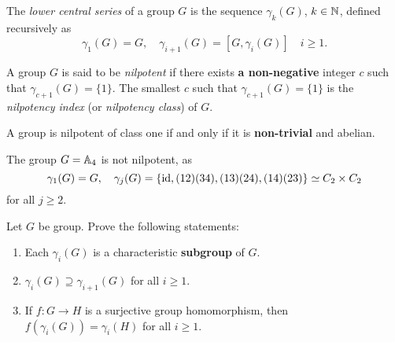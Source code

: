 The {\em lower central series} of a group $G$ is 
the sequence $\gamma_k(G)$, $k\in\mathbb{N}$, 
defined recursively as 
\[
		\gamma_1(G)=G,\quad
		\gamma_{i+1}(G)=[G,\gamma_i(G)]\quad i\geq 1.
\]

A group $G$ is said to be {\em nilpotent} if there exists {\bf a non-negative} integer $c$ such that 
$\gamma_{c+1}(G)=\{1\}$. The smallest $c$ such that $\gamma_{c+1}(G)=\{1\}$ is
the {\em nilpotency index} (or {\em nilpotency class}) of $G$. 


\begin{example}
	A group is nilpotent of class one if and only if it is {\bf non-trivial} and abelian.  
\end{example}


\begin{example}
    The group $G=\mathbb{A}_4$ is not nilpotent, as 
	\[
		\gamma_1(G)=G,\quad
		\gamma_j(G)=\{\operatorname{id},(12)(34),(13)(24),(14)(23)\}\simeq C_2\times C_2
	\]
	for all $j\geq2$. 
\end{example}

\begin{exercise}
	\label{xca:gamma}
	Let $G$ be group. Prove the following statements:
	\begin{enumerate}
		\item Each $\gamma_i(G)$ is a characteristic {\bf subgroup} of $G$.
		\item $\gamma_i(G)\supseteq\gamma_{i+1}(G)$ for all $i\geq1$.
		\item If $f\colon G\to H$ is a surjective group homomorphism, then 
			$f(\gamma_i(G))=\gamma_i(H)$ for all $i\geq 1$.
	\end{enumerate}
\end{exercise}


